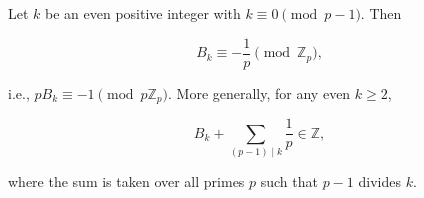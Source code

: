 Let $k$ be an even positive integer with $k \equiv 0 \pmod{p-1}$. Then

$$B_k \equiv -\frac{1}{p} \pmod{\mathbb{Z}_p},$$

i.e., $p B_k \equiv -1 \pmod{p \mathbb{Z}_p}$. More generally, for any even $k \geq 2$,

$$B_k + \sum_{(p-1) \mid k} \frac{1}{p} \in \mathbb{Z},$$

where the sum is taken over all primes $p$ such that $p-1$ divides $k$.
